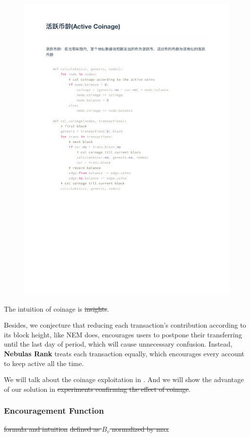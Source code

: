 \begin{figure}
\includegraphics{coinage.pdf}	
\end{figure}


The intuition of coinage is \st{insights}.

Besides, we conjecture that reducing each transaction's contribution according to its block height, like NEM does\cite{nem}, encourages users to postpone their transferring until the last day of period, which will cause unnecessary confusion. Instead, \textbf{Nebulas Rank} treats each transaction equally, which encourages every account to keep active all the time.

We will talk about the coinage exploitation in . And we will show the advantage of our solution in  \st{experiments confirming the effect of coinage}.


\subsubsection{Encouragement Function}\label{subsec:encouragement}
\st{formula and intuition} \st{defined as $B_v$ normalized by max}

